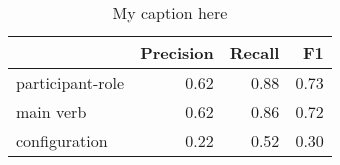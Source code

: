 \begin{table}[!ht]
\centering
\begin{tabular}{lrrr}
\toprule
{} &  Precision &  Recall &   F1 \\
\midrule
participant-role &       0.62 &    0.88 & 0.73 \\
main verb        &       0.62 &    0.86 & 0.72 \\
configuration    &       0.22 &    0.52 & 0.30 \\
\bottomrule
\end{tabular}
\caption{My caption here}
\label{tab:unit-elements-transitivity-exact-F1}
\end{table}